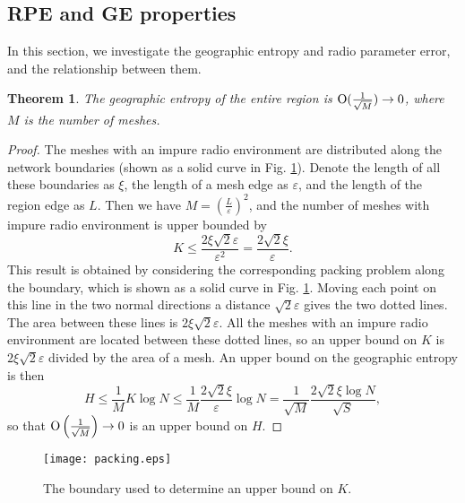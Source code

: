 \documentclass[conference]{IEEEtran}
\newtheorem{Theo}{Theorem}
\begin{document}
\subsection{RPE and GE properties}
In this section, we investigate the geographic entropy and radio parameter error,
and the relationship between them.
\begin{Theo}
\label{th_jiangshang}
The geographic entropy of the entire region is ${{\rm O}}({\frac{1}{{\sqrt M }}} ) \to 0$,
where $M$ is the number of meshes.
\end{Theo}
\begin{proof}
The meshes with an impure radio environment are distributed along the network boundaries (shown as a solid curve in Fig. \ref{fig_packing}).
Denote the length of all these boundaries as $\xi$, the length of a mesh edge as $\varepsilon$, and the length of the region edge as $L$.
Then we have $M = {( {\frac{L}{\varepsilon }} )^2}$, and
the number of meshes with impure radio environment is upper bounded by
\begin{equation}\label{eq_K_upper_bound}
K \le \frac{{2\xi \sqrt 2 \varepsilon }}{{{\varepsilon ^2}}} = \frac{{2\sqrt 2 \xi}}{\varepsilon }.
\end{equation}
This result is obtained by considering the corresponding packing problem along the boundary, which is
shown as a solid curve in Fig. \ref{fig_packing}.
Moving each point on this line in the two normal directions a distance $\sqrt 2 \varepsilon$ gives the two dotted lines.
The area between these lines is $2\xi \sqrt 2 \varepsilon$.
All the meshes with an impure radio environment are located between these dotted lines, so
an upper bound on $K$ is $2\xi \sqrt 2 \varepsilon$ divided by the area of a mesh.
An upper bound on the geographic entropy is then
\begin{equation}
H \le \frac{1}{M}K\log N \le \frac{1}{M}\frac{{2\sqrt 2 \xi }}{\varepsilon }\log N =
\frac{1}{{\sqrt M }}\frac{{2\sqrt 2 \xi \log N}}{{\sqrt S }},
\end{equation}
so that ${\rm O} \left( {\frac{1}{{\sqrt M }}} \right) \to 0$ is an upper bound on $H$.
\end{proof}

\begin{figure}[!t]
\centering
\texttt{[image: packing.eps]}
\caption{The boundary used to determine an upper bound on $K$.} \label{fig_packing}
\end{figure}
\end{document}
